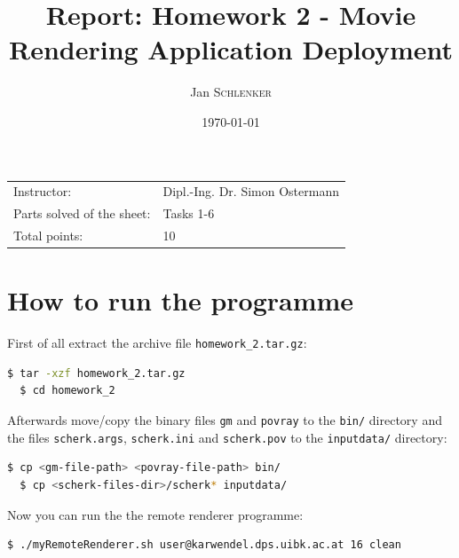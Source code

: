 \documentclass{article}
\title{Report: Homework 2 - Movie Rendering Application Deployment}%
\author{Jan \textsc{Schlenker}} %
\date{\today} %
\begin{document}
\maketitle %

\begin{center}
\begin{tabular}{l l}
Instructor: & Dipl.-Ing. Dr. Simon Ostermann \\
Parts solved of the sheet: & Tasks 1-6 \\
Total points: & 10
\end{tabular}
\end{center}



\section{How to run the programme}

First of all extract the archive file \texttt{homework\_2.tar.gz}:

\begin{lstlisting}[language=bash, deletekeywords={cd}]
  $ tar -xzf homework_2.tar.gz
  $ cd homework_2
\end{lstlisting}

Afterwards move/copy the binary files \texttt{gm} and \texttt{povray} to the \texttt{bin/} directory and the files \texttt{scherk.args}, \texttt{scherk.ini} and \texttt{scherk.pov} to the \texttt{inputdata/} directory:

\begin{lstlisting}[language=bash]
  $ cp <gm-file-path> <povray-file-path> bin/
  $ cp <scherk-files-dir>/scherk* inputdata/
\end{lstlisting}

Now you can run the the remote renderer programme:

\begin{lstlisting}[language=bash]
  $ ./myRemoteRenderer.sh user@karwendel.dps.uibk.ac.at 16 clean
\end{lstlisting}
\end{document}
